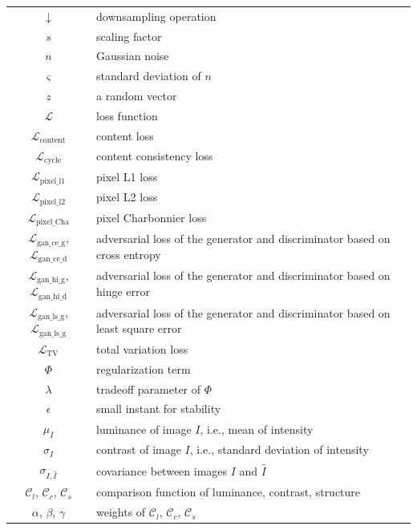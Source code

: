 {\begin{table}[h]
\begin{tabular}{|c|l|}
        $\downarrow$    & downsampling operation \\
        $s$             & scaling factor \\
        $n$             & Gaussian noise \\
        $\varsigma$     & standard deviation of $n$ \\
        $z$             & a random vector \\
        \hline
        $\mathcal{L}$   & loss function \\
        $\mathcal{L}_{\text{content}}$     & content loss \\
        $\mathcal{L}_{\text{cycle}}$       & content consistency loss \\
        $\mathcal{L}_{\text{pixel\_l1}}$   & pixel L1 loss \\
        $\mathcal{L}_{\text{pixel\_l2}}$   & pixel L2 loss \\
        $\mathcal{L}_{\text{pixel\_Cha}}$  & pixel Charbonnier loss \\
        $\mathcal{L}_{\text{gan\_ce\_g}}$, $\mathcal{L}_{\text{gan\_ce\_d}}$  & adversarial loss of the generator and discriminator based on cross entropy \\
        $\mathcal{L}_{\text{gan\_hi\_g}}$, $\mathcal{L}_{\text{gan\_hi\_d}}$  & adversarial loss of the generator and discriminator based on hinge error \\
        $\mathcal{L}_{\text{gan\_ls\_g}}$, $\mathcal{L}_{\text{gan\_ls\_g}}$  & adversarial loss of the generator and discriminator based on least square error \\
        $\mathcal{L}_{\text{TV}}$          & total variation loss \\
        $\Phi$          & regularization term \\
        $\lambda$       & tradeoff parameter of $\Phi$ \\
        $\epsilon$      & small instant for stability \\
        \hline
        $\mu_I$         & luminance of image $I$, i.e., mean of intensity \\
        $\sigma_I$      & contrast of image $I$, i.e., standard deviation of intensity \\
        $\sigma_{I,\hat{I}}$ & covariance between images $I$ and $\hat{I}$ \\
        $\mathcal{C}_l$, $\mathcal{C}_c$, $\mathcal{C}_s$ & comparison function of luminance, contrast, structure \\
        $\alpha$, $\beta$, $\gamma$                       & weights of $\mathcal{C}_l$, $\mathcal{C}_c$, $\mathcal{C}_s$ \\

\end{tabular}
\end{table}}

